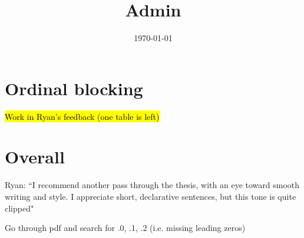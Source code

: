 \documentclass[12pt]{article}
\title{Admin}
\date{\today}
\begin{document}
\maketitle

\section*{Ordinal blocking}
	\begin{coi}
		\item \hl{Work in Ryan's feedback (one table is left)}
	\end{coi}
			
\section*{Overall}
	\begin{coi}
		\item Ryan: ``I recommend another pass through the thesis, with an eye toward smooth writing and style. I appreciate short, declarative sentences, but this tone is quite clipped"
		\item Go through pdf and search for .0, .1, .2 (i.e. missing leading zeros)
	\end{coi}	
\end{document}
